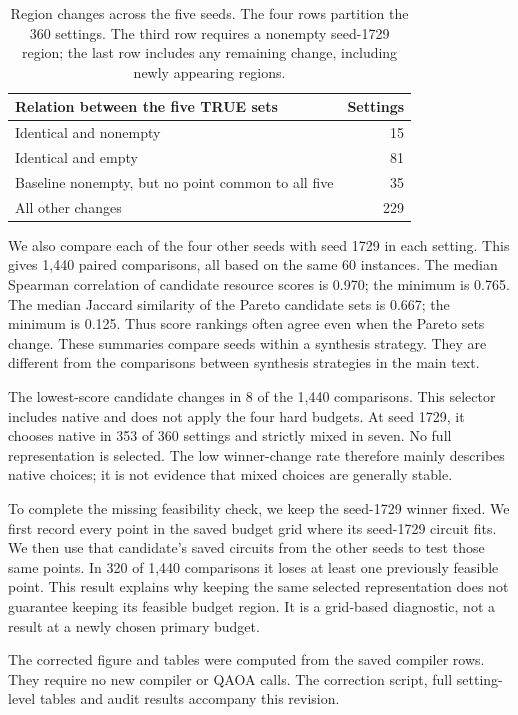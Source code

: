 \documentclass[a4paper,onecolumn,11pt,unpublished]{quantumarticle}
\theoremstyle{remark}
\begin{document}
\begin{table}[htbp]\centering\small
\caption{Region changes across the five seeds. The four rows partition
the 360 settings. The third row requires a nonempty seed-1729 region;
the last row includes any remaining change, including newly appearing regions.}
\label{tab:multiseed-region-changes}
\begin{tabular}{lr}\toprule
Relation between the five TRUE sets & Settings\\\midrule
Identical and nonempty & 15\\
Identical and empty & 81\\
Baseline nonempty, but no point common to all five & 35\\
All other changes & 229\\\bottomrule
\end{tabular}\end{table}

We also compare each of the four other seeds with seed 1729 in each
setting. This gives 1,440 paired comparisons, all based on the same 60
instances. The median Spearman correlation of candidate resource scores
is 0.970; the minimum is 0.765. The median Jaccard similarity of the
Pareto candidate sets is 0.667; the minimum is 0.125.
Thus score rankings often agree even when the Pareto sets change.
These summaries compare seeds within a synthesis strategy. They are
different from the comparisons between synthesis strategies in the main text.

The lowest-score candidate changes in 8 of the 1,440 comparisons.
This selector includes native and does not apply the four hard budgets.
At seed 1729, it chooses native in 353 of 360 settings and strictly mixed
in seven. No full representation is selected. The low winner-change rate
therefore mainly describes native choices; it is not evidence that mixed
choices are generally stable.

To complete the missing feasibility check, we keep the seed-1729 winner
fixed. We first record every point in the saved budget grid where its
seed-1729 circuit fits. We then use that candidate's saved circuits from
the other seeds to test those same points. In 320 of 1,440 comparisons it
loses at least one previously feasible point. This result explains why
keeping the same selected representation does not guarantee keeping its
feasible budget region. It is a grid-based diagnostic, not a result at
a newly chosen primary budget.

The corrected figure and tables were computed from the saved compiler
rows. They require no new compiler or QAOA calls. The correction script,
full setting-level tables and audit results accompany this revision.
\end{document}
